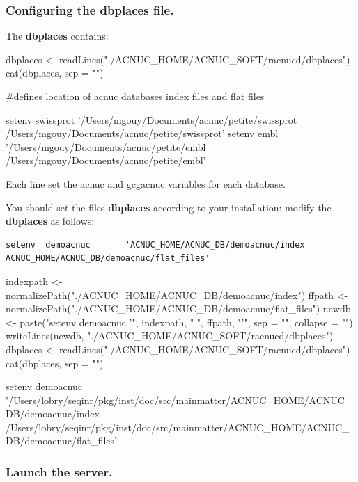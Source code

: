 \documentclass{article}
\begin{document}
\subsubsection{Configuring the dbplaces file.}


The \textbf{dbplaces} contains:

\begin{Schunk}
\begin{Sinput}
 dbplaces <- readLines("./ACNUC_HOME/ACNUC_SOFT/racnucd/dbplaces")
 cat(dbplaces, sep = "\n")
\end{Sinput}
\begin{Soutput}
#defines location of acnuc databases index files and flat files

setenv 	swissprot 	'/Users/mgouy/Documents/acnuc/petite/swissprot /Users/mgouy/Documents/acnuc/petite/swissprot'
setenv 	embl 	'/Users/mgouy/Documents/acnuc/petite/embl /Users/mgouy/Documents/acnuc/petite/embl'
\end{Soutput}
\end{Schunk}

Each line set the acnuc and gcgacnuc variables for each   database.


You should set the files \textbf{dbplaces}  according to your installation:
 modify  the \textbf{dbplaces} as follows:
\begin{verbatim}
setenv  demoacnuc       'ACNUC_HOME/ACNUC_DB/demoacnuc/index ACNUC_HOME/ACNUC_DB/demoacnuc/flat_files'
\end{verbatim}

\begin{Schunk}
\begin{Sinput}
 indexpath <- normalizePath("./ACNUC_HOME/ACNUC_DB/demoacnuc/index")
 ffpath <- normalizePath("./ACNUC_HOME/ACNUC_DB/demoacnuc/flat_files")
 newdb <- paste("setenv demoacnuc '", indexpath, " ", ffpath, 
     "'", sep = "", collapse = "")
 writeLines(newdb, "./ACNUC_HOME/ACNUC_SOFT/racnucd/dbplaces")
 dbplaces <- readLines("./ACNUC_HOME/ACNUC_SOFT/racnucd/dbplaces")
 cat(dbplaces, sep = "\n")
\end{Sinput}
\begin{Soutput}
setenv demoacnuc '/Users/lobry/seqinr/pkg/inst/doc/src/mainmatter/ACNUC_HOME/ACNUC_DB/demoacnuc/index /Users/lobry/seqinr/pkg/inst/doc/src/mainmatter/ACNUC_HOME/ACNUC_DB/demoacnuc/flat_files'
\end{Soutput}
\end{Schunk}

\subsubsection{Launch the server.}
\end{document}
